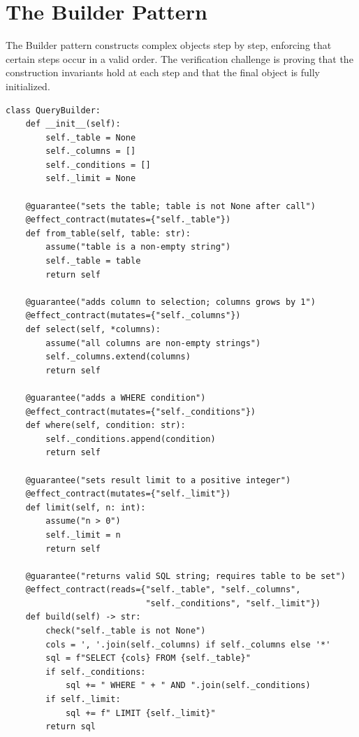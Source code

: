 \documentclass[11pt,a4paper]{report}
\theoremstyle{definition}
\theoremstyle{plain}
\begin{document}
\section{The Builder Pattern}

The Builder pattern constructs complex objects step by step, enforcing
that certain steps occur in a valid order.  The verification challenge
is proving that the construction invariants hold at each step and that
the final object is fully initialized.

\begin{lstlisting}[style=synhopy]
class QueryBuilder:
    def __init__(self):
        self._table = None
        self._columns = []
        self._conditions = []
        self._limit = None

    @guarantee("sets the table; table is not None after call")
    @effect_contract(mutates={"self._table"})
    def from_table(self, table: str):
        assume("table is a non-empty string")
        self._table = table
        return self

    @guarantee("adds column to selection; columns grows by 1")
    @effect_contract(mutates={"self._columns"})
    def select(self, *columns):
        assume("all columns are non-empty strings")
        self._columns.extend(columns)
        return self

    @guarantee("adds a WHERE condition")
    @effect_contract(mutates={"self._conditions"})
    def where(self, condition: str):
        self._conditions.append(condition)
        return self

    @guarantee("sets result limit to a positive integer")
    @effect_contract(mutates={"self._limit"})
    def limit(self, n: int):
        assume("n > 0")
        self._limit = n
        return self

    @guarantee("returns valid SQL string; requires table to be set")
    @effect_contract(reads={"self._table", "self._columns",
                            "self._conditions", "self._limit"})
    def build(self) -> str:
        check("self._table is not None")
        cols = ', '.join(self._columns) if self._columns else '*'
        sql = f"SELECT {cols} FROM {self._table}"
        if self._conditions:
            sql += " WHERE " + " AND ".join(self._conditions)
        if self._limit:
            sql += f" LIMIT {self._limit}"
        return sql
\end{lstlisting}
\end{document}
